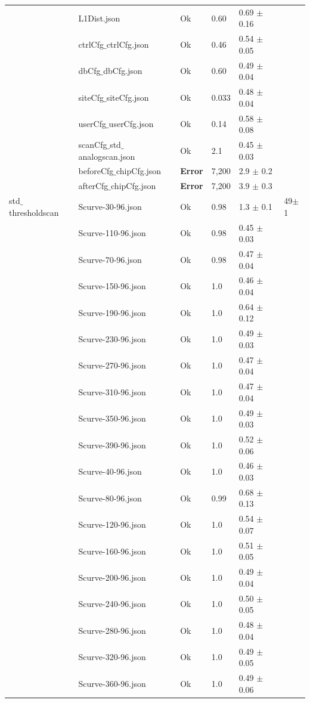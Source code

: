 {\begin{longtable}{|llllll|}
 & L1Dist.json & Ok & 0.60 & 0.69 $\pm$ 0.16 & \\
 & ctrlCfg$\_$ctrlCfg.json & Ok & 0.46 & 0.54 $\pm$ 0.05 & \\
 & dbCfg$\_$dbCfg.json & Ok & 0.60 & 0.49 $\pm$ 0.04 & \\
 & siteCfg$\_$siteCfg.json & Ok & 0.033 & 0.48 $\pm$ 0.04 & \\
 & userCfg$\_$userCfg.json & Ok & 0.14 & 0.58 $\pm$ 0.08 & \\
 & scanCfg$\_$std$\_$analogscan.json & Ok & 2.1 & 0.45 $\pm$ 0.03 & \\
 & beforeCfg$\_$chipCfg.json & { \bf Error} & 7,200 & 2.9 $\pm$ 0.2 & \\
 & afterCfg$\_$chipCfg.json & { \bf Error} & 7,200 & 3.9 $\pm$ 0.3 & \\
\hline
std$\_$thresholdscan & Scurve-30-96.json & Ok & 0.98 & 1.3 $\pm$ 0.1 & 49$\pm$1\\
 & Scurve-110-96.json & Ok & 0.98 & 0.45 $\pm$ 0.03 & \\
 & Scurve-70-96.json & Ok & 0.98 & 0.47 $\pm$ 0.04 & \\
 & Scurve-150-96.json & Ok & 1.0 & 0.46 $\pm$ 0.04 & \\
 & Scurve-190-96.json & Ok & 1.0 & 0.64 $\pm$ 0.12 & \\
 & Scurve-230-96.json & Ok & 1.0 & 0.49 $\pm$ 0.03 & \\
 & Scurve-270-96.json & Ok & 1.0 & 0.47 $\pm$ 0.04 & \\
 & Scurve-310-96.json & Ok & 1.0 & 0.47 $\pm$ 0.04 & \\
 & Scurve-350-96.json & Ok & 1.0 & 0.49 $\pm$ 0.03 & \\
 & Scurve-390-96.json & Ok & 1.0 & 0.52 $\pm$ 0.06 & \\
 & Scurve-40-96.json & Ok & 1.0 & 0.46 $\pm$ 0.03 & \\
 & Scurve-80-96.json & Ok & 0.99 & 0.68 $\pm$ 0.13 & \\
 & Scurve-120-96.json & Ok & 1.0 & 0.54 $\pm$ 0.07 & \\
 & Scurve-160-96.json & Ok & 1.0 & 0.51 $\pm$ 0.05 & \\
 & Scurve-200-96.json & Ok & 1.0 & 0.49 $\pm$ 0.04 & \\
 & Scurve-240-96.json & Ok & 1.0 & 0.50 $\pm$ 0.05 & \\
 & Scurve-280-96.json & Ok & 1.0 & 0.48 $\pm$ 0.04 & \\
 & Scurve-320-96.json & Ok & 1.0 & 0.49 $\pm$ 0.05 & \\
 & Scurve-360-96.json & Ok & 1.0 & 0.49 $\pm$ 0.06 & \\

\end{longtable}}
